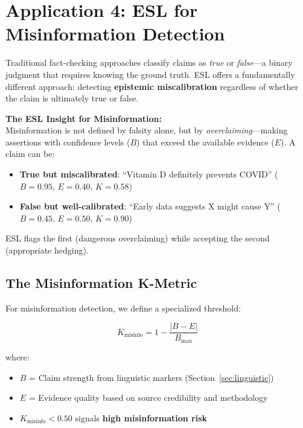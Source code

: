 \documentclass[11pt,a4paper]{article}
\begin{document}
\section{Application 4: ESL for Misinformation Detection}
\label{sec:application-misinformation}

Traditional fact-checking approaches classify claims as \textit{true} or \textit{false}---a binary judgment that requires knowing the ground truth. ESL offers a fundamentally different approach: detecting \textbf{epistemic miscalibration} regardless of whether the claim is ultimately true or false.

\begin{insightbox}
\textbf{The ESL Insight for Misinformation:} \\
Misinformation is not defined by falsity alone, but by \textit{overclaiming}---making assertions with confidence levels ($B$) that exceed the available evidence ($E$). A claim can be:
\begin{itemize}
    \item \textbf{True but miscalibrated}: ``Vitamin D definitely prevents COVID'' ($B=0.95$, $E=0.40$, $K=0.58$)
    \item \textbf{False but well-calibrated}: ``Early data suggests X might cause Y'' ($B=0.45$, $E=0.50$, $K=0.90$)
\end{itemize}
ESL flags the first (dangerous overclaiming) while accepting the second (appropriate hedging).
\end{insightbox}

\subsection{The Misinformation K-Metric}

For misinformation detection, we define a specialized threshold:

\begin{equation}
K_{\text{misinfo}} = 1 - \frac{|B - E|}{B_{\max}}
\end{equation}

where:
\begin{itemize}
    \item $B$ = Claim strength from linguistic markers (Section~\ref{sec:linguistic})
    \item $E$ = Evidence quality based on source credibility and methodology
    \item $K_{\text{misinfo}} < 0.50$ signals \textbf{high misinformation risk}
\end{itemize}
\end{document}
